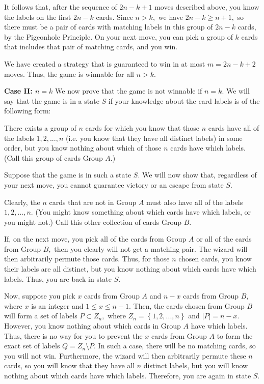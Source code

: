 \begin{enumerate}
 It follows that, after the sequence of $2n-k+1$ moves described above, you know the labels on the first $2n-k$ cards. Since $n > k,$ we have $2n-k \ge n+1,$ so there must be a pair of cards with matching labels in this group of $2n-k$ cards, by the Pigeonhole Principle. On your next move, you can pick a group of $k$ cards that includes that pair of matching cards, and you win.

 We have created a strategy that is guaranteed to win in at most $m = 2n-k+2$ moves. Thus, the game is winnable for all $n > k.$

 \textbf{Case II: $n=k$} We now prove that the game is not winnable if $n=k.$ We will say that the game is in a state $S$ if your knowledge about the card labels is of the following form:

 There exists a group of $n$ cards for which you know that those $n$ cards have all of the labels $1, 2, ..., n$ (i.e. you know that they have all distinct labels) in some order, but you know nothing about which of those $n$ cards have which labels. (Call this group of cards Group $A.$)

 Suppose that the game is in such a state $S.$ We will now show that, regardless of your next move, you cannot guarantee victory or an escape from state $S.$

 Clearly, the $n$ cards that are not in Group $A$ must also have all of the labels $1, 2, ..., n.$ (You might know something about which cards have which labels, or you might not.) Call this other collection of cards Group $B.$

 If, on the next move, you pick all of the cards from Group $A$ or all of the cards from Group $B,$ then you clearly will not get a matching pair. The wizard will then arbitrarily permute those cards. Thus, for those $n$ chosen cards, you know their labels are all distinct, but you know nothing about which cards have which labels. Thus, you are back in state $S.$

 Now, suppose you pick $x$ cards from Group $A$ and $n-x$ cards from Group $B,$ where $x$ is an integer and $1\le x\le n-1.$ Then, the cards chosen from Group $B$ will form a set of labels $P\subset Z_n,$ where $Z_n = \left\{ {1, 2, ..., n} \right\}$ and $|P| = n-x.$ However, you know nothing about which cards in Group $A$ have which labels. Thus, there is no way for you to prevent the $x$ cards from Group $A$ to form the exact set of labels $Q = Z_n\setminus P.$ In such a case, there will be no matching cards, so you will not win. Furthermore, the wizard will then arbitrarily permute these $n$ cards, so you will know that they have all $n$ distinct labels, but you will know nothing about which cards have which labels. Therefore, you are again in state $S.$


\end{enumerate}
